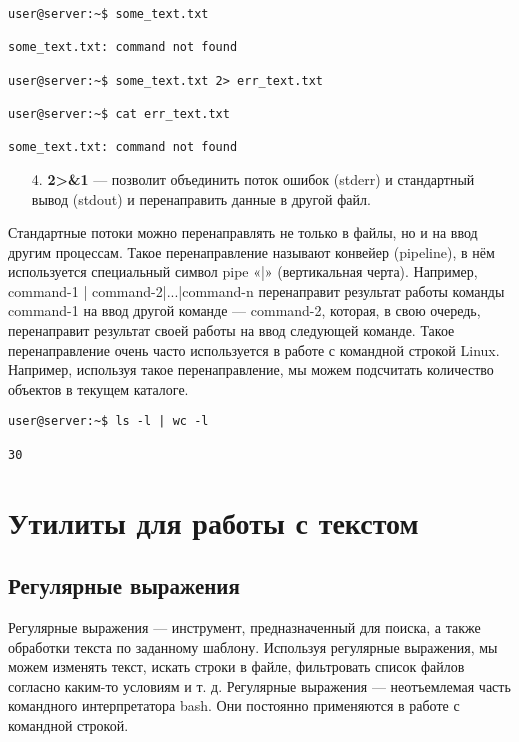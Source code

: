 \documentclass[14pt, a4paper]{article}
\begin{document}
\begin{lstlisting}
user@server:~$ some_text.txt

some_text.txt: command not found

user@server:~$ some_text.txt 2> err_text.txt

user@server:~$ cat err_text.txt

some_text.txt: command not found
\end{lstlisting}

\begin{enumerate}
    \item[4.] \textbf{2>\&1} — позволит объединить поток ошибок (stderr) и стандартный вывод (stdout) и
    перенаправить данные в другой файл.
\end{enumerate}

\noindent Стандартные потоки можно перенаправлять не только в файлы, но и на ввод другим процессам. Такое
перенаправление называют конвейер (pipeline), в нём используется специальный символ pipe «|»
(вертикальная черта). Например, \colorbox{backcolour}{command-1 | command-2|...|command-n} перенаправит результат
работы команды \colorbox{backcolour}{command-1} на ввод другой команде — \colorbox{backcolour}{command-2}, которая, в свою очередь,
перенаправит результат своей работы на ввод следующей команде. Такое перенаправление очень
часто используется в работе с командной строкой Linux. Например, используя такое
перенаправление, мы можем подсчитать количество объектов в текущем каталоге.

\vspace{0.5cm}

\begin{lstlisting}
user@server:~$ ls -l | wc -l

30
\end{lstlisting}

\section*{Утилиты для работы с текстом} 

\subsection*{Регулярные выражения} 

Регулярные выражения — инструмент, предназначенный для поиска, а также обработки текста по
заданному шаблону. Используя регулярные выражения, мы можем изменять текст, искать строки в
файле, фильтровать список файлов согласно каким-то условиям и т. д. Регулярные выражения —
неотъемлемая часть командного интерпретатора bash. Они постоянно применяются в работе с
командной строкой.\\
\end{document}
